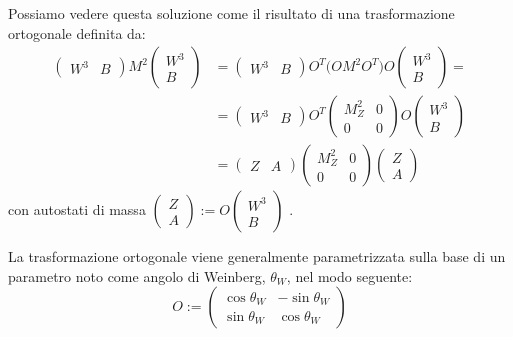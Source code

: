 \documentclass[../main.tex]{subfiles}
\begin{document}
Possiamo vedere questa soluzione come il risultato di una trasformazione ortogonale definita da:
\begin{align*}
    \begin{pmatrix} W^3 & B \end{pmatrix} 
    M^2
    \begin{pmatrix} W^3 \\ B \end{pmatrix} &= 
    \begin{pmatrix} W^3 & B \end{pmatrix} O^T \big(O
    M^2 O^T \big) O
    \begin{pmatrix} W^3 \\ B \end{pmatrix} =\\
    &=\begin{pmatrix} W^3 & B \end{pmatrix} O^T \begin{pmatrix}
        M_Z^2& 0   \\
        0    & 0
    \end{pmatrix} O
    \begin{pmatrix} W^3 \\ B \end{pmatrix}\\
    &=\begin{pmatrix} Z & A \end{pmatrix} 
    \begin{pmatrix}
        M_Z^2& 0   \\
        0    & 0
    \end{pmatrix}
    \begin{pmatrix} Z \\ A \end{pmatrix}
\end{align*}
con autostati di massa $\begin{pmatrix} Z \\ A \end{pmatrix}:=O\begin{pmatrix} W^3 \\ B \end{pmatrix}$ .

La trasformazione ortogonale viene generalmente parametrizzata sulla base di un parametro noto come angolo di Weinberg, $\theta_W$, nel modo seguente:
\[
O :=
\begin{pmatrix}
    \cos\theta_W    & -\sin\theta_W   \\
    \sin\theta_W    & \cos\theta_W
\end{pmatrix}
\]
\end{document}
